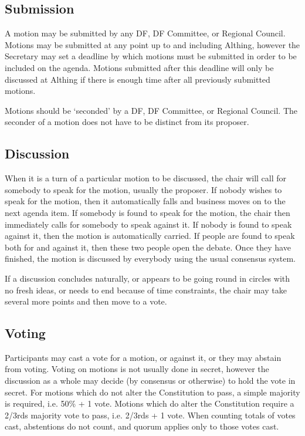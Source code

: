 \documentclass[a4paper, 12pt]{article} %
\begin{document}
\subsection{Submission}
A motion may be submitted by any DF, DF Committee, or Regional Council.  Motions may be submitted at any point up to and including Althing, however the Secretary may set a deadline by which motions must be submitted in order to be included on the agenda.  Motions submitted after this deadline will only be discussed at Althing if there is enough time after all previously submitted motions.

Motions should be `seconded' by a DF, DF Committee, or Regional Council.  The seconder of a motion does not have to be distinct from its proposer.

\subsection{Discussion}
When it is a turn of a particular motion to be discussed, the chair will call for somebody to speak for the motion, usually the proposer.  If nobody wishes to speak for the motion, then it automatically falls and business moves on to the next agenda item.  If somebody is found to speak for the motion, the chair then immediately calls for somebody to speak against it.  If nobody is found to speak against it, then the motion is automatically carried.  If people are found to speak both for and against it, then these two people open the debate.  Once they have finished, the motion is discussed by everybody using the usual consensus system.

If a discussion concludes naturally, or appears to be going round in circles with no fresh ideas, or needs to end because of time constraints, the chair may take several more points and then move to a vote.

\subsection{Voting}
Participants may cast a vote for a motion, or against it, or they may abstain from voting.  Voting on motions is not usually done in secret, however the discussion as a whole may decide (by consensus or otherwise) to hold the vote in secret.  For motions which do not alter the Constitution to pass, a simple majority is required, i.e. 50\% + 1 vote.  Motions which do alter the Constitution require a 2/3rds majority vote to pass, i.e. 2/3rds + 1 vote.  When counting totals of votes cast, abstentions do not count, and quorum applies only to those votes cast.
\end{document}
